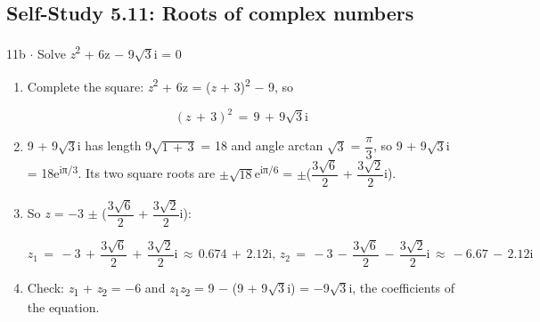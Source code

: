 \documentclass[11pt]{article}
\begin{document}
\begin{keepsection}\subsection{Self-Study 5.11: Roots of complex numbers}

\begin{workedbox}{11b \ensuremath{\cdot} Solve \textit{z}\textsuperscript{2} + 6z \ensuremath{-} 9\ensuremath{\sqrt{3}}i = 0}
\begin{enumerate}
\item {}
Complete the square: \textit{z}\textsuperscript{2} + 6z = (\textit{z} + 3)\textsuperscript{2} \ensuremath{-} 9, so

\begin{equation*}({z}\, +\, 3)^{2}\, =\, 9\, +\, 9\sqrt{3}\mathrm{i}\end{equation*}
\item 9 + 9\ensuremath{\sqrt{3}}i has length 9\ensuremath{\sqrt{1\, +\, 3}} = 18 and angle arctan \ensuremath{\sqrt{3}} = {\small\ensuremath{\dfrac{π}{3}}}, so 9 + 9\ensuremath{\sqrt{3}}i = 18e\textsuperscript{iπ/3}. Its two square roots are \ensuremath{\pm}\ensuremath{\sqrt{18}}e\textsuperscript{iπ/6} = \ensuremath{\pm}({\small\ensuremath{\dfrac{3\sqrt{6}}{2}}} + {\small\ensuremath{\dfrac{3\sqrt{2}}{2}}}i).
\item {}
So \textit{z} = \ensuremath{-}3 \ensuremath{\pm} ({\small\ensuremath{\dfrac{3\sqrt{6}}{2}}} + {\small\ensuremath{\dfrac{3\sqrt{2}}{2}}}i):

\begin{equation*}{z}_{1}\, =\, -3\, +\, \dfrac{3\sqrt{6}}{2}\, +\, \dfrac{3\sqrt{2}}{2}\mathrm{i}\, \approx \, 0.674\, +\, 2.12\mathrm{i},\, {z}_{2}\, =\, -3\, -\, \dfrac{3\sqrt{6}}{2}\, -\, \dfrac{3\sqrt{2}}{2}\mathrm{i}\, \approx \, -6.67\, -\, 2.12\mathrm{i}\end{equation*}
\item Check: \textit{z}\textsubscript{1} + \textit{z}\textsubscript{2} = \ensuremath{-}6 and \textit{z}\textsubscript{1}\textit{z}\textsubscript{2} = 9 \ensuremath{-} (9 + 9\ensuremath{\sqrt{3}}i) = \ensuremath{-}9\ensuremath{\sqrt{3}}i, the coefficients of the equation.
\end{enumerate}
\end{workedbox}

\end{keepsection}
\end{document}

